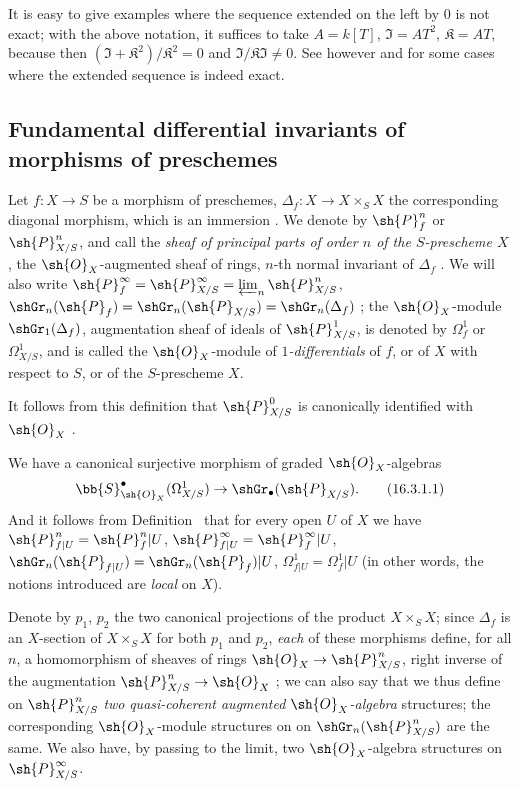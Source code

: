 It is easy to give examples where the sequence  extended on the left by $0$ is not exact;
with the above notation, it suffices to take $A = k[T]$, $\mathfrak{I} = AT^2$, $\mathfrak{K} = AT$, because then $(\mathfrak{I} + \mathfrak{K}^2)/\mathfrak{K}^2 = 0$ and $\mathfrak{I}/\mathfrak{K}\mathfrak{I} \neq 0$.
See however  and  for some cases where the extended sequence is indeed exact.

\subsection{Fundamental differential invariants of morphisms of preschemes}
\label{IV.16.3}

\begin{definition}[16.3.1]
\label{IV.16.3.1}
Let $f:X \to S$ be a morphism of preschemes, $\Delta_f: X \to X \times_S X$ the corresponding diagonal morphism, which is an immersion .
We denote by $\sh{P}_f^n$ or $\sh{P}_{X/S}^n$, and call the \emph{sheaf of principal parts of order $n$ of the $S$-prescheme $X$}, the $\sh{O}_X$-augmented sheaf of rings, $n$-th normal invariant of $\Delta_f$ .
We will also write $\sh{P}_f^\infty = \sh{P}_{X/S}^\infty = \varprojlim_n \sh{P}_{X/S}^n$, $\shGr_n(\sh{P}_f) = \shGr_n(\sh{P}_{X/S}) = \shGr_n(\Delta_f)$ ;
the $\sh{O}_X$-module $\shGr_1(\Delta_f)$, augmentation sheaf of ideals of $\sh{P}_{X/S}^1$, is denoted by $\Omega_f^1$ or $\Omega_{X/S}^1$, and is called the $\sh{O}_X$-module of \emph{$1$-differentials} of $f$, or of $X$ with respect to $S$, or of the $S$-prescheme $X$.
\end{definition}

It follows from this definition that $\sh{P}_{X/S}^0$ is canonically identified with $\sh{O}_X$ .

We have  a canonical surjective morphism of graded $\sh{O}_X$-algebras 
\[
  \label{IV.16.3.1.1}
  \bb{S}_{\sh{O}_X}^\bullet(\Omega_{X/S}^1) \to \shGr_\bullet(\sh{P}_{X/S}).
  \tag{16.3.1.1}
\]
And it follows from Definition~ that for every open $U$ of $X$ we have $\sh{P}_{f|U}^n = \sh{P}_f^n|U$, $\sh{P}_{f|U}^\infty = \sh{P}_f^\infty|U$, $\shGr_n(\sh{P}_{f|U}) = \shGr_n(\sh{P}_f)|U$, $\Omega_{f|U}^1 = \Omega_f^1|U$ (in other words, the notions introduced are \emph{local} on $X$).

\begin{env}[16.3.2]
\label{IV.16.3.2}
Denote by $p_1$, $p_2$ the two canonical projections of the product $X \times_S X$;
since $\Delta_f$ is an $X$-section of $X \times_S X$ for both $p_1$ and $p_2$, \emph{each} of these morphisms define, for all $n$, a homomorphism of sheaves of rings $\sh{O}_X \to \sh{P}_{X/S}^n$, right inverse of the augmentation $\sh{P}_{X/S}^n \to \sh{O}_X$ ;
we can also say that we thus define on $\sh{P}_{X/S}^n$ \emph{two} \emph{quasi-coherent augmented $\sh{O}_X$-algebra} structures;
the corresponding $\sh{O}_X$-module structures on on $\shGr_n(\sh{P}_{X/S}^n)$ are the same. 
We also have, by passing to the limit, two $\sh{O}_X$-algebra structures on $\sh{P}_{X/S}^\infty$.
\end{env}

